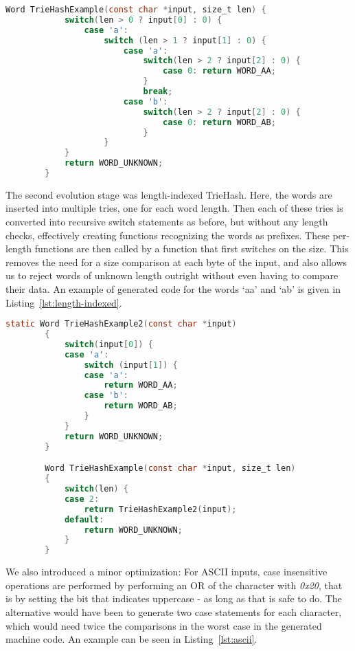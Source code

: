 \documentclass[parskip=half]{scrartcl}
\begin{document}
    \begin{lstlisting}[language=C,gobble=8,label=lst:initial,caption=Code generated by initial triehash version,frame=tb]
        Word TrieHashExample(const char *input, size_t len) {
            switch(len > 0 ? input[0] : 0) {
                case 'a':
                    switch (len > 1 ? input[1] : 0) {
                        case 'a':
                            switch(len > 2 ? input[2] : 0) {
                                case 0: return WORD_AA;
                            }
                            break;
                        case 'b':
                            switch(len > 2 ? input[2] : 0) {
                                case 0: return WORD_AB;
                            }
                    }
            }
            return WORD_UNKNOWN;
        }
    \end{lstlisting}

    The second evolution stage was length-indexed TrieHash. Here, the words
    are inserted into multiple tries, one for each word length. Then each of
    these tries is converted into recursive switch statements as before, but
    without any length checks, effectively creating functions recognizing the
    words as prefixes. These per-length functions are then called by a function
    that first switches on the size. This removes the need for a size comparison
    at each byte of the input, and also allows us to reject words of unknown
    length outright without even having to compare their data. An example of
    generated code for the words `aa' and `ab' is given in Listing~\ref{lst:length-indexed}.

    \begin{lstlisting}[language=C,gobble=8,label=lst:length-indexed,caption=Length-Indexed TrieHash,frame=tb]
        static Word TrieHashExample2(const char *input)
        {
            switch(input[0]) {
            case 'a':
                switch (input[1]) {
                case 'a':
                    return WORD_AA;
                case 'b':
                    return WORD_AB;
                }
            }
            return WORD_UNKNOWN;
        }

        Word TrieHashExample(const char *input, size_t len)
        {
            switch(len) {
            case 2:
                return TrieHashExample2(input);
            default:
                return WORD_UNKNOWN;
            }
        }
    \end{lstlisting}

    We also introduced a minor optimization: For ASCII inputs, case insensitive
    operations are performed by performing an OR of the character with \textit{0x20},
    that is by setting the bit that indicates uppercase - as long as that is
    safe to do. The alternative would have been to generate two case statements
    for each character, which would need twice the comparisons in the worst
    case in the generated machine code. An example can be seen in Listing~\ref{lst:ascii}.
\end{document}
